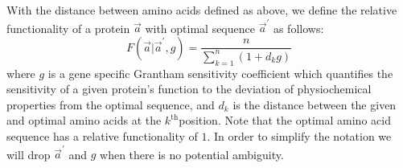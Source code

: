 \documentclass[13pt]{article}
\newcommand{\avecopt}{\ensuremath{\vec{a}^\prime}\xspace}
\newcommand{\aopt}{\ensuremath{a^\prime}\xspace}
\begin{document}


With the distance between amino acids defined as above, we define the relative functionality of a protein $\vec{a}$ with optimal sequence $\avecopt$ as follows:
\begin{equation}
F(\vec{a}| \avecopt,g)  =  \frac{n}{\sum_{k=1}^n{(1+d_kg)}} \label{eq:harmonic}
\end{equation}
where $g$ is a gene specific Grantham sensitivity coefficient which quantifies the sensitivity of a given protein's function to the deviation of physiochemical properties from the optimal sequence, and $d_k$ is the distance between the given and optimal amino acids at the $k^{\text{th}}$position.
Note that the optimal amino acid sequence has a relative functionality of $1$. 
In order to simplify the notation we will drop $\avecopt$ and $g$ when there is no potential ambiguity.
\end{document}
